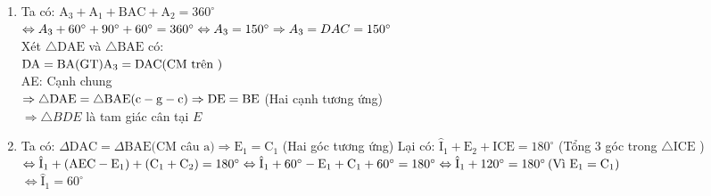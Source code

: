 \begin{bt}
{\begin{enumerate}
                $
                \mathrm{DA} =\mathrm{BA}(\mathrm{GT}) \\[5px]
                \mathrm{DAC} =\mathrm{BAE}(\mathrm{CM} \text { trên) } \\[5px]
                \mathrm{AC} =\mathrm{AE}(\mathrm{GT}) \\[5px]
                \Rightarrow \Delta \mathrm{DAC} =\Delta \mathrm{BAE}(\mathrm{c}-\mathrm{g}-\mathrm{c}) \Rightarrow \mathrm{BE}=\mathrm{CD} \text { (Hai cạnh tương ứng) }
                $
				\item Ta có:  $\mathrm{A}_3+\mathrm{A}_1+\mathrm{BAC}+\mathrm{A}_2=360^{\circ}$\\[5px]
				$ \Leftrightarrow A_3+60^{\circ}+90^{\circ}+60^{\circ}=360^{\circ} \\[5px]
				 \Leftrightarrow A_3=150^{\circ} \\[5px]
				 \Rightarrow A_3=D A C=150^{\circ}$\\[5px]
				 Xét $\triangle \mathrm{DAE}$ và $\triangle \mathrm{BAE}$ có:\\[5px]
				 $
				 \mathrm{DA}=\mathrm{BA}(\mathrm{GT}) \\[5px]
				 \mathrm{A}_3=\mathrm{DAC}(\mathrm{CM} \text { trên })$\\[5px]
				 AE: Cạnh chung\\[5px]
				 $\Rightarrow \triangle \mathrm{DAE}=\triangle \mathrm{BAE}(\mathrm{c}-\mathrm{g}-\mathrm{c}) \\[5px]\Rightarrow \mathrm{DE}=\mathrm{BE}$ (Hai cạnh tương ứng)\\[5px]
				 $\Rightarrow \triangle B D E$ là tam giác cân tại $E$
				 \item Ta có: $\Delta \mathrm{DAC}=\Delta \mathrm{BAE}(\mathrm{CM}$ câu $\mathrm{a}) \Rightarrow \mathrm{E}_1=\mathrm{C}_1$ (Hai góc tương ứng)
				 Lại có: $\hat{\mathrm{I}}_1+\mathrm{E}_2+\mathrm{ICE}=180^{\circ}$ (Tổng 3 góc trong $\triangle \mathrm{ICE}$ )\\[5px]
				 $
				 \Leftrightarrow \hat{\mathrm{I}}_1+\left(\mathrm{AEC}-\mathrm{E}_1\right)+\left(\mathrm{C}_1+\mathrm{C}_2\right)=180^{\circ} \\[5px]
				 \Leftrightarrow \hat{\mathrm{I}}_1+60^{\circ}-\mathrm{E}_1+\mathrm{C}_1+60^{\circ}=180^{\circ} \\[5px]
				 \Leftrightarrow \hat{\mathrm{I}}_1+120^{\circ}=180^{\circ}\left(\text{Vì } \mathrm{E}_1=\mathrm{C}_1\right)$\\[5px] 
				 $\Leftrightarrow \hat{\mathrm{I}}_1=60^{\circ}$\\[5px]

\end{enumerate}}
\end{bt}
